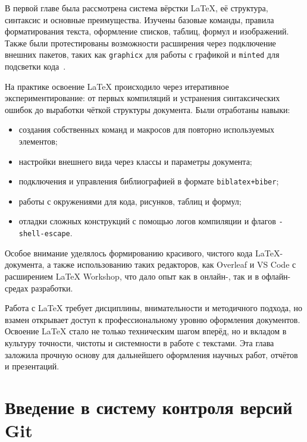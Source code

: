 \documentclass[a4paper,12pt]{report}
\begin{document}

В первой главе была рассмотрена система вёрстки \LaTeX{}, её структура, синтаксис и основные преимущества. Изучены базовые команды, правила форматирования текста, оформление списков, таблиц, формул и изображений. Также были протестированы возможности расширения через подключение внешних пакетов, таких как \texttt{graphicx} для работы с графикой и \texttt{minted} для подсветки кода~\cite{latex_minted}.

На практике освоение \LaTeX{} происходило через итеративное экспериментирование: от первых компиляций и устранения синтаксических ошибок до выработки чёткой структуры документа. Были отработаны навыки:
\begin{itemize}
\item создания собственных команд и макросов для повторно используемых элементов;
\item настройки внешнего вида через классы и параметры документа;
\item подключения и управления библиографией в формате \texttt{biblatex+biber};
\item работы с окружениями для кода, рисунков, таблиц и формул;
\item отладки сложных конструкций с помощью логов компиляции и флагов \verb|-shell-escape|.
\end{itemize}

Особое внимание уделялось формированию красивого, чистого кода LaTeX-документа, а также использованию таких редакторов, как Overleaf и VS Code с расширением LaTeX Workshop, что дало опыт как в онлайн-, так и в офлайн-средах разработки.

Работа с \LaTeX{} требует дисциплины, внимательности и методичного подхода, но взамен открывает доступ к профессиональному уровню оформления документов. Освоение LaTeX стало не только техническим шагом вперёд, но и вкладом в культуру точности, чистоты и системности в работе с текстами. Эта глава заложила прочную основу для дальнейшего оформления научных работ, отчётов и презентаций.


\chapter{Введение в систему контроля версий Git}\label{git_introduction}
\end{document}
